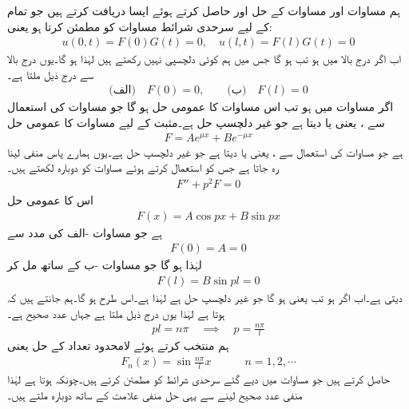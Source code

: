  \quad  ہم مساوات  اور مساوات  کے حل  اور  حاصل کرتے ہوئے ایسا  دریافت کرتے ہیں جو تمام  کے لیے سرحدی شرائط مساوات  کو مطمئن کرتا ہو یعنی:
\begin{align*}
u(0,t)=F(0)G(t)=0,\quad u(l,t)=F(l)G(t)=0
\end{align*}
اب اگر درج بالا میں   ہو تب  ہو گا جس میں ہم کوئی دلچسپی نہیں رکھتے ہیں لہٰذا  ہو گا۔یوں درج بالا سے درج ذیل ملتا ہے۔
\begin{align}\label{مساوات_جزوی_مساوات_موج_چ}
\text{(الف)}\quad F(0)=0,\quad \quad \text{(ب)}\quad F(l)=0
\end{align}
اگر مساوات  میں  ہو تب اس مساوات کا عمومی حل  ہو گا جو مساوات  کی استعمال سے ،  یعنی  یا  دیتا ہے جو غیر دلچسپ حل ہے۔مثبت  کے لیے مساوات  کا عمومی حل
\begin{align*}
F=Ae^{\mu x}+Be^{-\mu x}
\end{align*}
ہے جو مساوات  کی استعمال سے ،  یعنی  یا  دیتا ہے جو غیر دلچسپ حل ہے۔یوں ہمارے پاس منفی  لینا رہ جاتا ہے جس کو استعمال کرتے ہوئے مساوات  کو دوبارہ لکھتے ہیں۔
\begin{align*}
F''+p^2F=0
\end{align*}
اس کا عمومی حل
\begin{align*}
F(x)=A\cos px+B\sin px
\end{align*}
ہے جو مساوات -الف کی مدد سے
\begin{align*}
F(0)=A=0
\end{align*}
لہٰذا  ہو گا جو مساوات -ب کے ساتھ مل کر
\begin{align*}
F(l)=B\sin pl=0
\end{align*}
دیتی ہے۔اب اگر  ہو تب  یعنی  ہو گا جو غیر دلچسپ حل ہے لہٰذا  ہے۔اس طرح  ہو گا۔ہم جانتے ہیں کہ  ہوتا ہے لہٰذا یوں درج ذیل ملتا ہے جہاں  عدد صحیح ہے۔
\begin{align}\label{مساوات_جزوی_مساوات_موج_ح}
pl=n\pi \quad \implies \quad p=\frac{n\pi}{l}
\end{align}
ہم  منتخب کرتے ہوئے لامحدود تعداد کے حل  یعنی
\begin{align}\label{مساوات_جزوی_مساوات_موج_خ}
F_n(x)=\sin \frac{n\pi}{l}x\quad \quad \quad  n=1,2,\cdots
\end{align}
حاصل کرتے ہیں جو مساوات  میں دیے گئے سرحدی شرائط کو مطمئن کرتے ہیں۔چونکہ  ہوتا ہے لہٰذا  منفی عدد صحیح  لینے سے  یہی حل منفی علامت کے ساتھ دوبارہ ملتے ہیں۔

